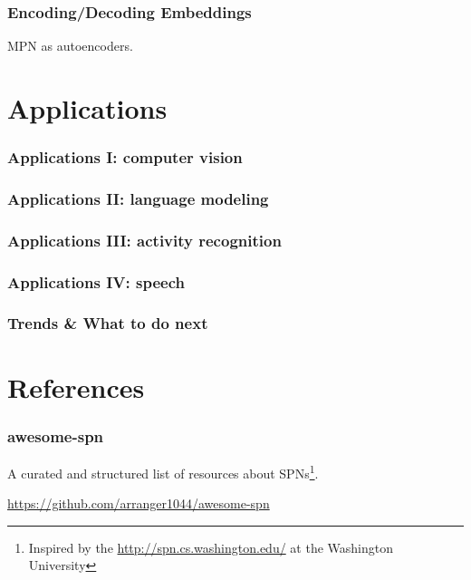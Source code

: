 \documentclass[xcolor={usenames,dvipsnames,svgnames}, compress]{beamer}
\begin{document}
\begin{frame}
  \frametitle{Encoding/Decoding Embeddings}
  MPN as autoencoders.
\end{frame}




\section{Applications}
{
  \begin{frame}
    \sectionpage
  \end{frame}
}

\begin{frame}
  \frametitle{Applications I: computer vision}
\end{frame}


\begin{frame}
\frametitle{Applications II: language modeling}
\end{frame}

\begin{frame}
  \frametitle{Applications III: activity recognition}
\end{frame}

\begin{frame}
  \frametitle{Applications IV: speech}
\end{frame}


\begin{frame}
\frametitle{Trends \& What to do next}
\end{frame}

\section{References}
{
  \begin{frame}
    \sectionpage
  \end{frame}
}

\begin{frame}
  \frametitle{awesome-spn}
  A curated and structured list of resources about SPNs\footnote{Inspired by the \href{SPN page}{http://spn.cs.washington.edu/} at the Washington University}.\par
  \url{https://github.com/arranger1044/awesome-spn}
\end{frame}

\begin{frame} [allowframebreaks]
  \setlength\bibitemsep{8pt}
  \printbibliography
\end{frame}
\end{document}

